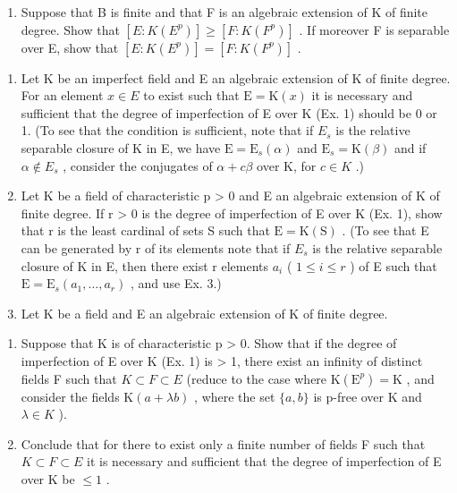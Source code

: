 \begin{enumerate}
\def\labelenumi{\alph{enumi})}
\setcounter{enumi}{1}
\tightlist
\item
  Suppose that B is finite and that F is an algebraic extension of K of finite degree. Show that \([E:K(E^{p})]\geqslant[F:K(F^{p})]\) . If moreover F is separable over E, show that \([E:K(E^{p})]=[F:K(F^{p})]\) .
\end{enumerate}

\begin{enumerate}
\def\labelenumi{\arabic{enumi})}
\setcounter{enumi}{2}
\item
  Let K be an imperfect field and E an algebraic extension of K of finite degree. For an element \(x \in E\) to exist such that \(\mathrm{E} = \mathrm{K}(x)\) it is necessary and sufficient that the degree of imperfection of E over K (Ex. 1) should be 0 or 1. (To see that the condition is sufficient, note that if \(E_{s}\) is the relative separable closure of K in E, we have \(\mathrm{E} = \mathrm{E}_{s}(\alpha)\) and \(\mathrm{E}_{s} = \mathrm{K}(\beta)\) and if \(\alpha \notin E_{s}\) , consider the conjugates of \(\alpha + c\beta\) over K, for \(c \in K\) .)
\item
  Let K be a field of characteristic p \textgreater{} 0 and E an algebraic extension of K of finite degree. If r \textgreater{} 0 is the degree of imperfection of E over K (Ex. 1), show that r is the least cardinal of sets S such that \(\mathrm{E} = \mathrm{K}(\mathrm{S})\) . (To see that E can be generated by r of its elements note that if \(E_{s}\) is the relative separable closure of K in E, then there exist r elements \(a_{i}\) ( \(1 \leqslant i \leqslant r\) ) of E such that \(\mathrm{E} = \mathrm{E}_{s}(a_{1}, \ldots, a_{r})\) , and use Ex. 3.)
\item
  Let K be a field and E an algebraic extension of K of finite degree.
\end{enumerate}

\begin{enumerate}
\def\labelenumi{\alph{enumi})}
\item
  Suppose that K is of characteristic p \textgreater{} 0. Show that if the degree of imperfection of E over K (Ex. 1) is \textgreater{} 1, there exist an infinity of distinct fields F such that \(K \subset F \subset E\) (reduce to the case where \(\mathrm{K}(\mathrm{E}^{p}) = \mathrm{K}\) , and consider the fields \(\mathrm{K}(a + \lambda b)\) , where the set \(\{a, b\}\) is p-free over K and \(\lambda \in K\) ).
\item
  Conclude that for there to exist only a finite number of fields F such that \(K \subset F \subset E\) it is necessary and sufficient that the degree of imperfection of E over K be \(\leqslant 1\) .
\end{enumerate}

